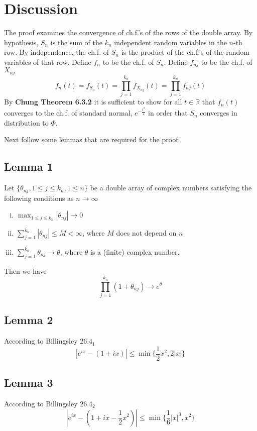 \documentclass[letterpaper, 12pt]{article}
\newcommand{\R}{\mathbb{R}}
\begin{document}
\section*{Discussion}
The proof examines the convergence of ch.f.'s of the rows of the double array. By hypothesis, $S_n$ is the sum of the $k_n$ independent random variables in the $n$-th row. By independence, the ch.f. of $S_n$ is the product of the ch.f.'s of the random variables of that row. Define $f_n$ to be the ch.f. of $S_n$.
Define $f_{nj}$ to be the ch.f. of $X_{nj}$
\[
f_n(t) = f_{S_n}(t) = \prod_{j=1}^{k_n} f_{X_{nj}}(t)
=
\prod_{j=1}^{k_n} f_{nj}(t)
\]
By \textbf{Chung Theorem 6.3.2} it is sufficient to show for all $t \in \R$ that $f_n(t)$ converges to the ch.f. of standard normal, $e^{-\frac{t^2}{2}}$ in order that $S_n$ converges in distribution to $\Phi$.

Next follow some lemmas that are required for the proof.

\subsection*{Lemma 1}
Let $\{ \theta_{nj}, 1\leq j \leq k_n, 1 \leq n  \}$ be a double array of complex numbers satisfying the following conditions as $n \to \infty$
\begin{enumerate}[(i)]
\item
$\max_{1 \leq j \leq k_n} |\theta_{nj}| \to 0$
\item
$\sum_{j=1}^{k_n} |\theta_{nj}| \leq M < \infty$, where $M$ does not depend on $n$
\item
$\sum_{j=1}^{k_n} \theta_{nj} \to \theta$, where $\theta$ is a (finite) complex number.
\end{enumerate}
Then we have 
\begin{equation*}
\prod_{j=1}^{k_n} (1 + \theta_{nj}) \to e^{\theta}
\end{equation*}

\subsection*{Lemma 2}
According to Billingsley $26.4_1$
\[
|e^{ix} - (1 + ix) | \leq \min \{   \frac{1}{2} x^2, 2|x| \} 
\]

\subsection*{Lemma 3}
According to Billingsley $26.4_2$
\[
|e^{ix} - (1 + ix -\frac{1}{2}x^2 ) | \leq \min \{   \frac{1}{6} |x|^3, x^2 \} 
\]
\end{document}
